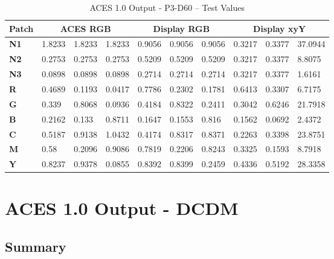 \begin{table}[ht!]
    \centering
    \begin{tabular}{|l|l|l|l|l|l|l|l|l|l|}
        \hline
        \multicolumn{1}{|c|}{\textbf{Patch}} & \multicolumn{3}{c|}{\textbf{ACES RGB}} & \multicolumn{3}{c|}{\textbf{Display RGB}} & \multicolumn{3}{c|}{\textbf{Display xyY}} \\ \hline
        \textbf{N1} & 1.8233 & 1.8233 & 1.8233 & 0.9056 & 0.9056 & 0.9056 & 0.3217 & 0.3377 & 37.0944 \\ \hline
        \textbf{N2} & 0.2753 & 0.2753 & 0.2753 & 0.5209 & 0.5209 & 0.5209 & 0.3217 & 0.3377 & 8.8075  \\ \hline
        \textbf{N3} & 0.0898 & 0.0898 & 0.0898 & 0.2714 & 0.2714 & 0.2714 & 0.3217 & 0.3377 & 1.6161  \\ \hline
        \textbf{R}  & 0.4689 & 0.1193 & 0.0417 & 0.7786 & 0.2302 & 0.1781 & 0.6413 & 0.3307 & 6.7175  \\ \hline
        \textbf{G}  & 0.339  & 0.8068 & 0.0936 & 0.4184 & 0.8322 & 0.2411 & 0.3042 & 0.6246 & 21.7918 \\ \hline
        \textbf{B}  & 0.2162 & 0.133  & 0.8711 & 0.1647 & 0.1553 & 0.816  & 0.1562 & 0.0692 & 2.4372  \\ \hline
        \textbf{C}  & 0.5187 & 0.9138 & 1.0432 & 0.4174 & 0.8317 & 0.8371 & 0.2263 & 0.3398 & 23.8751 \\ \hline
        \textbf{M}  & 0.58   & 0.2096 & 0.9086 & 0.7819 & 0.2206 & 0.8243 & 0.3325 & 0.1593 & 8.7918  \\ \hline
        \textbf{Y}  & 0.8237 & 0.9378 & 0.0855 & 0.8392 & 0.8399 & 0.2459 & 0.4336 & 0.5192 & 28.3358 \\ \hline
        \end{tabular}
        \caption[ACES 1.0 Output - P3-D60 -- Test Values]{ACES 1.0 Output - P3-D60 -- Test Values}
        \label{tab:testValues-p3d60}
\end{table}

\clearpage
\section{ACES 1.0 Output - DCDM}
\label{sec:odt-details-dcdm}

\subsection{Summary}
\label{subsec:summary-dcdm}

